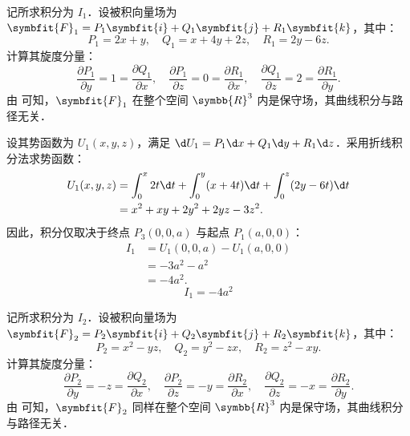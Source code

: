 \begin{solution}

    记所求积分为 $I_1$．设被积向量场为 $\symbfit{F}_1 = P_1 \symbfit{i} + Q_1 \symbfit{j} + R_1 \symbfit{k}$，其中：
    \begin{equation}
        P_1 = 2x+y, \quad Q_1 = x+4y+2z, \quad R_1 = 2y-6z.
    \end{equation}
    计算其旋度分量：
    \begin{equation}
        \label{eq:curl-check-1}
        \frac{\partial P_1}{\partial y} = 1 = \frac{\partial Q_1}{\partial x}, \quad
        \frac{\partial P_1}{\partial z} = 0 = \frac{\partial R_1}{\partial x}, \quad
        \frac{\partial Q_1}{\partial z} = 2 = \frac{\partial R_1}{\partial y}.
    \end{equation}
    由  可知，$\symbfit{F}_1$ 在整个空间 $\symbb{R}^3$ 内是保守场，其曲线积分与路径无关．

    设其势函数为 $U_1(x, y, z)$，满足 $\d U_1 = P_1 \d x + Q_1 \d y + R_1 \d z$．采用折线积分法求势函数：
    \begin{equation}
        \label{eq:potential-1}
        \begin{aligned}
            U_1(x, y, z) & = \int_0^x 2t \d t + \int_0^y (x + 4t) \d t + \int_0^z (2y - 6t) \d t \\
                         & = x^2 + xy + 2y^2 + 2yz - 3z^2.
        \end{aligned}
    \end{equation}
    因此，积分仅取决于终点 $P_3(0,0,a)$ 与起点 $P_1(a,0,0)$：
    \begin{equation}
        \begin{aligned}
            I_1 & = U_1(0, 0, a) - U_1(a, 0, 0) \\
                & = -3a^2 - a^2                 \\
                & = -4a^2.
        \end{aligned}
    \end{equation}
    \begin{equation}
        I_1 = \boxed{-4a^2}
    \end{equation}


    记所求积分为 $I_2$．设被积向量场为 $\symbfit{F}_2 = P_2 \symbfit{i} + Q_2 \symbfit{j} + R_2 \symbfit{k}$，其中：
    \begin{equation}
        P_2 = x^2 - yz, \quad Q_2 = y^2 - zx, \quad R_2 = z^2 - xy.
    \end{equation}
    计算其旋度分量：
    \begin{equation}
        \label{eq:curl-check-2}
        \frac{\partial P_2}{\partial y} = -z = \frac{\partial Q_2}{\partial x}, \quad
        \frac{\partial P_2}{\partial z} = -y = \frac{\partial R_2}{\partial x}, \quad
        \frac{\partial Q_2}{\partial z} = -x = \frac{\partial R_2}{\partial y}.
    \end{equation}
    由  可知，$\symbfit{F}_2$ 同样在整个空间 $\symbb{R}^3$ 内是保守场，其曲线积分与路径无关．


\end{solution}
